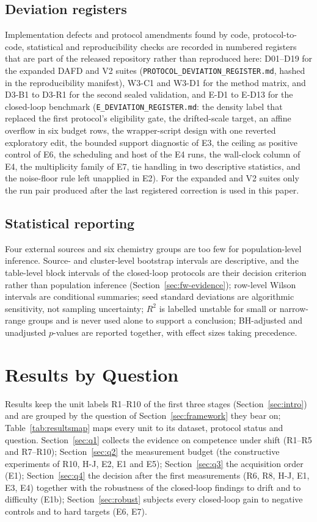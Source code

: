 \documentclass[11pt,a4paper]{article}
\begin{document}
\subsection{Deviation registers}
\label{sec:deviations}
Implementation defects and protocol amendments found by code,
protocol-to-code, statistical and reproducibility checks are recorded in
numbered registers that are part of the released repository rather than
reproduced here: D01--D19 for the expanded DAFD and V2 suites
(\texttt{PROTOCOL\_DEVIATION\_REGISTER.md}, hashed in the reproducibility
manifest), W3-C1 and W3-D1 for the method matrix, and D3-B1 to D3-R1 for the
second sealed validation, and E-D1 to E-D13 for the closed-loop benchmark
(\texttt{E\_DEVIATION\_REGISTER.md}: the density label that replaced the first
protocol's eligibility gate, the drifted-scale target, an affine overflow in
six budget rows, the wrapper-script design with one reverted exploratory edit,
the bounded support diagnostic of E3, the ceiling as positive control of E6,
the scheduling and host of the E4 runs, the wall-clock column of E4, the
multiplicity family of E7, tie handling in two descriptive statistics, and the
noise-floor rule left unapplied in E2). For the expanded and V2 suites only the run pair
produced after the last registered correction is used in this paper.

\subsection{Statistical reporting}
\label{sec:stats}
Four external sources and six chemistry groups are too few for
population-level inference. Source- and cluster-level bootstrap intervals are
descriptive, and the table-level block intervals of the closed-loop protocols
are their decision criterion rather than population inference
(Section~\ref{sec:fw-evidence}); row-level Wilson intervals are conditional summaries;
seed standard deviations are algorithmic sensitivity, not sampling
uncertainty; $R^2$ is labelled unstable for small or narrow-range groups and
is never used alone to support a conclusion; BH-adjusted and unadjusted
$p$-values are reported together, with effect sizes taking precedence.

\section{Results by Question}
\label{sec:results}
Results keep the unit labels R1--R10 of the first three stages
(Section~\ref{sec:intro}) and are grouped by the question of
Section~\ref{sec:framework} they bear on; Table~\ref{tab:resultsmap} maps
every unit to its dataset, protocol status and question. Section~\ref{sec:q1}
collects the evidence on competence under shift (R1--R5 and R7--R10); Section~\ref{sec:q2} the measurement budget (the
constructive experiments of R10, H-J, E2, E1 and E5); Section~\ref{sec:q3} the
acquisition order (E1); Section~\ref{sec:q4} the decision after the first
measurements (R6, R8, H-J, E1, E3, E4) together with the robustness of the
closed-loop findings to drift and to difficulty (E1b); Section~\ref{sec:robust} subjects every
closed-loop gain to negative controls and to hard targets (E6, E7).
\end{document}
